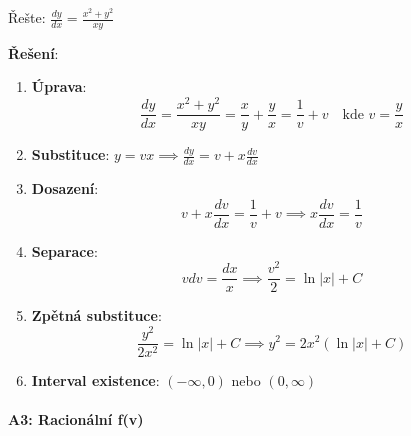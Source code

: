 \begin{example}
Řešte: $\frac{dy}{dx} = \frac{x^2 + y^2}{xy}$
\vspace{0.3\baselineskip}

\textbf{Řešení}: 
\begin{enumerate}
\item \textbf{Úprava}:
\[
\frac{dy}{dx} = \frac{x^2 + y^2}{xy} = \frac{x}{y} + \frac{y}{x} = \frac{1}{v} + v \quad \text{kde } v = \frac{y}{x}
\]

\item \textbf{Substituce}: $y = vx \implies \frac{dy}{dx} = v + x\frac{dv}{dx}$

\item \textbf{Dosazení}:
\[
v + x\frac{dv}{dx} = \frac{1}{v} + v \implies x\frac{dv}{dx} = \frac{1}{v}
\]

\item \textbf{Separace}:
\[
v  dv = \frac{dx}{x} \implies \frac{v^2}{2} = \ln|x| + C
\]

\item \textbf{Zpětná substituce}:
\[
\frac{y^2}{2x^2} = \ln|x| + C \implies y^2 = 2x^2(\ln|x| + C)
\]

\item \textbf{Interval existence}: $(-\infty, 0)$ nebo $(0, \infty)$
\end{enumerate}
\end{example}

\vspace{0.8\baselineskip}

\paragraph*{A3: Racionální f(v)}

